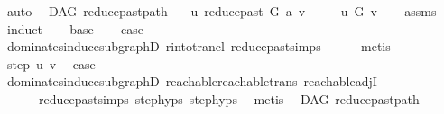 \begin{isabellebody}
\ auto%
\endisatagproof
{\isafoldproof}%
%
\isadelimproof
\isanewline
%
\endisadelimproof
\isanewline
{}\isamarkupfalse%
\ {\isacharparenleft}{\kern0pt}\ DAG{\isacharparenright}{\kern0pt}\ reduce{\isacharunderscore}{\kern0pt}past{\isacharunderscore}{\kern0pt}path{\isacharcolon}{\kern0pt}\isanewline
\ \ \ {\isachardoublequoteopen}u\ {\isasymrightarrow}\isactrlsup {\isacharplus}{\kern0pt}\isactrlbsub reduce{\isacharunderscore}{\kern0pt}past\ G\ a\isactrlesub \ v{\isachardoublequoteclose}\ \isanewline
\ \ \ {\isachardoublequoteopen}\ u\ {\isasymrightarrow}\isactrlsup {\isacharplus}{\kern0pt}\isactrlbsub G\isactrlesub \ v{\isachardoublequoteclose}\isanewline
%
\isadelimproof
\ \ %
\endisadelimproof
%
\isatagproof
{}\isamarkupfalse%
\ assms\isanewline
{}\isamarkupfalse%
\ induct\isanewline
\ \ \isamarkupfalse%
\ base\ \isamarkupfalse%
\ \isamarkupfalse%
\ {\isacharquery}{\kern0pt}case\isanewline
\ \ \ \ \isamarkupfalse%
\ dominates{\isacharunderscore}{\kern0pt}induce{\isacharunderscore}{\kern0pt}subgraphD\ r{\isacharunderscore}{\kern0pt}into{\isacharunderscore}{\kern0pt}trancl{\isacharprime}{\kern0pt}\ reduce{\isacharunderscore}{\kern0pt}past{\isachardot}{\kern0pt}simps\isanewline
\ \ \ \ \isamarkupfalse%
\ metis\isanewline
{}\isamarkupfalse%
\ \isamarkupfalse%
\ {\isacharparenleft}{\kern0pt}step\ u\ v{\isacharparenright}{\kern0pt}\ \isamarkupfalse%
\ {\isacharquery}{\kern0pt}case\isanewline
\ \ \ \ \isamarkupfalse%
\ dominates{\isacharunderscore}{\kern0pt}induce{\isacharunderscore}{\kern0pt}subgraphD\ reachable{}{\isacharunderscore}{\kern0pt}reachable{\isacharunderscore}{\kern0pt}trans\ reachable{\isacharunderscore}{\kern0pt}adjI\ \isanewline
\ \ \ \ \ \ reduce{\isacharunderscore}{\kern0pt}past{\isachardot}{\kern0pt}simps\ step{\isachardot}{\kern0pt}hyps{\isacharparenleft}{\kern0pt}{}{\isacharparenright}{\kern0pt}\ step{\isachardot}{\kern0pt}hyps{\isacharparenleft}{\kern0pt}{}{\isacharparenright}{\kern0pt}\ \isamarkupfalse%
\ metis\isanewline
\isanewline
{}\isamarkupfalse%
%
\endisatagproof
{\isafoldproof}%
%
\isadelimproof
\isanewline
%
\endisadelimproof
\isanewline
{}\isamarkupfalse%
\ {\isacharparenleft}{\kern0pt}\ DAG{\isacharparenright}{\kern0pt}\ reduce{\isacharunderscore}{\kern0pt}past{\isacharunderscore}{\kern0pt}path{}{\isacharcolon}{\kern0pt}\isanewline

\end{isabellebody}

